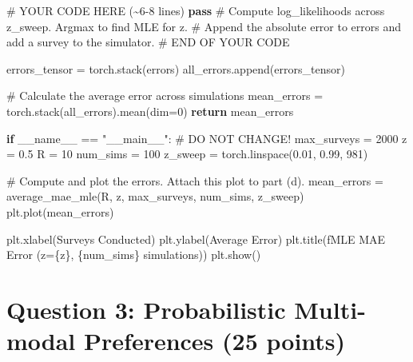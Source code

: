 \documentclass[
  letterpaper,
  DIV=11,
  numbers=noendperiod,
  oneside]{scrreprt}
\newenvironment{Shaded}{\begin{snugshade}}{\end{snugshade}}
\newcommand{\CommentTok}[1]{\textcolor[rgb]{0.37,0.37,0.37}{#1}}
\newcommand{\ControlFlowTok}[1]{\textcolor[rgb]{0.00,0.23,0.31}{\textbf{#1}}}
\newcommand{\DecValTok}[1]{\textcolor[rgb]{0.68,0.00,0.00}{#1}}
\newcommand{\FloatTok}[1]{\textcolor[rgb]{0.68,0.00,0.00}{#1}}
\newcommand{\NormalTok}[1]{\textcolor[rgb]{0.00,0.23,0.31}{#1}}
\newcommand{\OperatorTok}[1]{\textcolor[rgb]{0.37,0.37,0.37}{#1}}
\newcommand{\RegionMarkerTok}[1]{\textcolor[rgb]{0.00,0.23,0.31}{#1}}
\newcommand{\SpecialCharTok}[1]{\textcolor[rgb]{0.37,0.37,0.37}{#1}}
\newcommand{\SpecialStringTok}[1]{\textcolor[rgb]{0.13,0.47,0.30}{#1}}
\newcommand{\StringTok}[1]{\textcolor[rgb]{0.13,0.47,0.30}{#1}}
\newcommand{\VariableTok}[1]{\textcolor[rgb]{0.07,0.07,0.07}{#1}}
\theoremstyle{remark}
\begin{document}
\begin{Shaded}
\begin{Highlighting}[]
            \CommentTok{\# YOUR CODE HERE (\textasciitilde{}6{-}8 lines)}
            \ControlFlowTok{pass} \CommentTok{\# Compute log\_likelihoods across z\_sweep. Argmax to find MLE for z. }
                 \CommentTok{\# Append the absolute error to errors and add a survey to the simulator.}
            \CommentTok{\# }\RegionMarkerTok{END}\CommentTok{ OF YOUR CODE}

\NormalTok{        errors\_tensor }\OperatorTok{=}\NormalTok{ torch.stack(errors) }
\NormalTok{        all\_errors.append(errors\_tensor)}

    \CommentTok{\# Calculate the average error across simulations }
\NormalTok{    mean\_errors }\OperatorTok{=}\NormalTok{ torch.stack(all\_errors).mean(dim}\OperatorTok{=}\DecValTok{0}\NormalTok{)}
    \ControlFlowTok{return}\NormalTok{ mean\_errors}

\ControlFlowTok{if} \VariableTok{\_\_name\_\_} \OperatorTok{==} \StringTok{"\_\_main\_\_"}\NormalTok{:}
    \CommentTok{\# DO NOT CHANGE!}
\NormalTok{    max\_surveys }\OperatorTok{=} \DecValTok{2000}
\NormalTok{    z }\OperatorTok{=} \FloatTok{0.5}
\NormalTok{    R }\OperatorTok{=} \DecValTok{10}
\NormalTok{    num\_sims }\OperatorTok{=} \DecValTok{100}
\NormalTok{    z\_sweep }\OperatorTok{=}\NormalTok{ torch.linspace(}\FloatTok{0.01}\NormalTok{, }\FloatTok{0.99}\NormalTok{, }\DecValTok{981}\NormalTok{)}

    \CommentTok{\# Compute and plot the errors. Attach this plot to part (d).}
\NormalTok{    mean\_errors }\OperatorTok{=}\NormalTok{ average\_mae\_mle(R, z, max\_surveys, num\_sims, z\_sweep)}
\NormalTok{    plt.plot(mean\_errors)}

\NormalTok{    plt.xlabel(}\StringTok{\textquotesingle{}Surveys Conducted\textquotesingle{}}\NormalTok{)}
\NormalTok{    plt.ylabel(}\StringTok{\textquotesingle{}Average Error\textquotesingle{}}\NormalTok{)}
\NormalTok{    plt.title(}\SpecialStringTok{f\textquotesingle{}MLE MAE Error (z=}\SpecialCharTok{\{}\NormalTok{z}\SpecialCharTok{\}}\SpecialStringTok{, }\SpecialCharTok{\{}\NormalTok{num\_sims}\SpecialCharTok{\}}\SpecialStringTok{ simulations)\textquotesingle{}}\NormalTok{)}
\NormalTok{    plt.show()}
\end{Highlighting}
\end{Shaded}

\section*{Question 3: Probabilistic Multi-modal Preferences (25
points)}\label{question-3-probabilistic-multi-modal-preferences-25-points}
\end{document}
